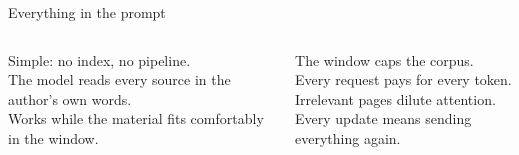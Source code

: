 \begin{frame}{Everything in the prompt}
  \begin{center}
  \end{center}
  \vspace{0.4em}
  \begin{columns}[T,onlytextwidth]
      {\small
      Simple: no index, no pipeline.\\[0.4em]
      The model reads every source in the author's own words.\\[0.4em]
      Works while the material fits comfortably in the window.\par}
      {\small
      The window caps the corpus.\\[0.4em]
      Every request pays for every token.\\[0.4em]
      Irrelevant pages dilute attention.\\[0.4em]
      Every update means sending everything again.\par}
  \end{columns}
\end{frame}

